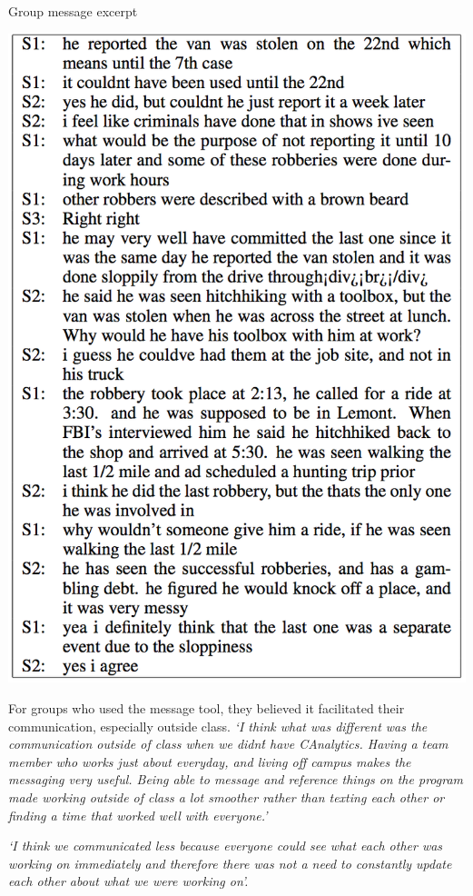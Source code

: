 \begin{table}
	\centering
	\caption{Group message excerpt}
    \includegraphics[width=.9\linewidth]{img/group_chat}
	\label{tab:chat}
\end{table}

For groups who used the message tool, they believed it facilitated their communication, especially outside class. 
\textit{`I think what was different was the communication outside of class when we didn\'t have CAnalytics. Having a team member who works just about everyday, and living off campus makes the messaging very useful. Being able to message and reference things on the program made working outside of class a lot smoother rather than texting each other or finding a time that worked well with everyone.'}

\textit{`I think we communicated less because everyone could see what each other was working on immediately and therefore there was not a need to constantly update each other about what we were working on'.}


